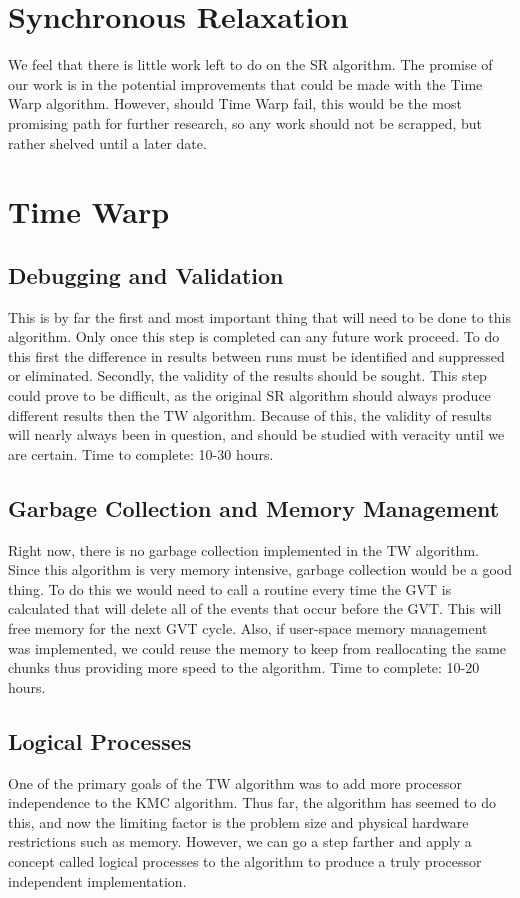 
\section{Synchronous Relaxation}

We feel that there is little work left to do on the SR algorithm.  The promise of our work is in the potential improvements that could be made with the Time Warp algorithm.  However, should Time Warp fail, this would be the most promising path for further research, so any work should not be scrapped, but rather shelved until a later date.

\section{Time Warp}

\subsection{Debugging and Validation}
This is by far the first and most important thing that will need to be done to this algorithm.  Only once this step is completed can any future work proceed.  To do this first the difference in results between runs must be identified and suppressed or eliminated.  Secondly, the validity of the results should be sought.  This step could prove to be difficult, as the original SR algorithm should always produce different results then the TW algorithm.  Because of this, the validity of results will nearly always been in question, and should be studied with veracity until we are certain.  Time to complete: 10-30 hours.

\subsection{Garbage Collection and Memory Management}
Right now, there is no garbage collection implemented in the TW algorithm.  Since this algorithm is very memory intensive, garbage collection would be a good thing.  To do this we would need to call a routine every time the GVT is calculated that will delete all of the events that occur before the GVT.  This will free memory for the next GVT cycle.  Also, if user-space memory management was implemented, we could reuse the memory to keep from reallocating the same chunks thus providing more speed to the algorithm. Time to complete: 10-20 hours.

\subsection{Logical Processes}
One of the primary goals of the TW algorithm was to add more processor independence to the KMC algorithm.  Thus far, the algorithm has seemed to do this, and now the limiting factor is the problem size and physical hardware restrictions such as memory.  However, we can go a step farther and apply a concept called logical processes to the algorithm to produce a truly processor independent implementation.

